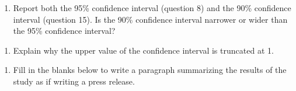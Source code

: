 \documentclass[
]{report}
\providecommand{\tightlist}{%
  \setlength{\itemsep}{0pt}\setlength{\parskip}{0pt}}
\begin{document}
\begin{enumerate}
\def\labelenumi{\arabic{enumi}.}
\setcounter{enumi}{15}
\tightlist
\item
  Report both the 95\% confidence interval (question 8) and the 90\% confidence interval (question 15). Is the 90\% confidence interval narrower or wider than the 95\% confidence interval?
\end{enumerate}

\vspace{0.5in}

\begin{enumerate}
\def\labelenumi{\arabic{enumi}.}
\setcounter{enumi}{16}
\tightlist
\item
  Explain why the upper value of the confidence interval is truncated at 1.
\end{enumerate}

\vspace{0.3in}


\begin{enumerate}
\def\labelenumi{\arabic{enumi}.}
\setcounter{enumi}{17}
\tightlist
\item
  Fill in the blanks below to write a paragraph summarizing the results of the study as if writing a press release.
\end{enumerate}
\end{document}
